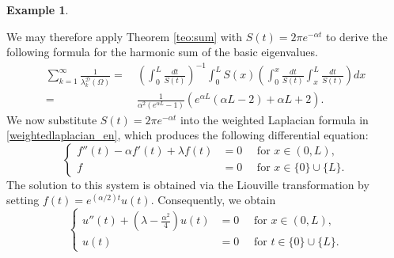 \documentclass{amsart}
\theoremstyle{definition}
\newtheorem{example}[theorem]{Example}
\theoremstyle{remark}
\numberwithin{equation}{section}
\begin{document}
\begin{example}
\begin{enumerate}
We may therefore apply Theorem \ref{teo:sum} with $S(t)=2\pi e^{-\alpha t}$ to derive the following formula for the harmonic sum of the basic eigenvalues.
\begin{equation*}\label{formspec1}
 \begin{aligned}
 \sum_{k=1}^{\infty}\frac{1}{\lambda_k^{\mathcal{D}}(\Omega)} =& \ \left( \int_{0}^L\frac{dt}{S(t)} \right)^{-1} \int_0^L S(x)\left(\int_0^x\frac{dt}{S(t)}\int_x^L\frac{dt}{S(t)}\right)dx \\
 =& \ \frac{1}{\alpha^2(e^{\alpha L}-1)}\left( e^{\alpha L}(\alpha L -2) + \alpha L + 2 \right).
 \end{aligned}
\end{equation*}
We now substitute $S(t)=2\pi e^{-\alpha t}$ into the weighted Laplacian formula in \eqref{weightedlaplacian_en}, which produces the following differential equation:
\begin{equation*}\label{laplacianwith}
\left\{\begin{aligned}
f''(t) -\alpha f'(t) +\lambda f(t) &= 0 \quad \text{ for } x \in (0,L),\\
f&= 0 \quad \text{ for } x\in \{0\}\cup \{L\}.
\end{aligned}
\right.
\end{equation*}
The solution to this system is obtained via the Liouville transformation by setting $f(t)=e^{(\alpha/2)t}u(t)$. Consequently, we obtain
\begin{equation*}
\left\{\begin{aligned}
u''(t) + \left(\lambda - \frac{\alpha^2}{4} \right) u(t) &= 0 \quad \text{ for } x \in (0,L),\\
u(t) &= 0 \quad \text{ for } t\in \{0\}\cup \{L\}.
\end{aligned}
\right.
\end{equation*}


\end{enumerate}
\end{example}
\end{document}
